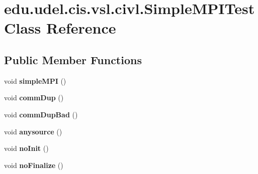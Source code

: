\hypertarget{classedu_1_1udel_1_1cis_1_1vsl_1_1civl_1_1SimpleMPITest}{}\section{edu.\+udel.\+cis.\+vsl.\+civl.\+Simple\+M\+P\+I\+Test Class Reference}
\label{classedu_1_1udel_1_1cis_1_1vsl_1_1civl_1_1SimpleMPITest}
\subsection*{Public Member Functions}
\begin{DoxyCompactItemize}
\item 
\hypertarget{classedu_1_1udel_1_1cis_1_1vsl_1_1civl_1_1SimpleMPITest_aabe92de2ada800d99d33b2e758fec8b9}{}void {\bfseries simple\+M\+P\+I} ()\label{classedu_1_1udel_1_1cis_1_1vsl_1_1civl_1_1SimpleMPITest_aabe92de2ada800d99d33b2e758fec8b9}

\item 
\hypertarget{classedu_1_1udel_1_1cis_1_1vsl_1_1civl_1_1SimpleMPITest_ab0e93f3e5bb94f5e2af7a9b6030aa806}{}void {\bfseries comm\+Dup} ()\label{classedu_1_1udel_1_1cis_1_1vsl_1_1civl_1_1SimpleMPITest_ab0e93f3e5bb94f5e2af7a9b6030aa806}

\item 
\hypertarget{classedu_1_1udel_1_1cis_1_1vsl_1_1civl_1_1SimpleMPITest_a67f129927e3798cc6d531cfe8e8eda6b}{}void {\bfseries comm\+Dup\+Bad} ()\label{classedu_1_1udel_1_1cis_1_1vsl_1_1civl_1_1SimpleMPITest_a67f129927e3798cc6d531cfe8e8eda6b}

\item 
\hypertarget{classedu_1_1udel_1_1cis_1_1vsl_1_1civl_1_1SimpleMPITest_a473a3d1949b66ff6d12a2d099d451c12}{}void {\bfseries anysource} ()\label{classedu_1_1udel_1_1cis_1_1vsl_1_1civl_1_1SimpleMPITest_a473a3d1949b66ff6d12a2d099d451c12}

\item 
\hypertarget{classedu_1_1udel_1_1cis_1_1vsl_1_1civl_1_1SimpleMPITest_a7a445fd948d68347f85217290ba6ecef}{}void {\bfseries no\+Init} ()\label{classedu_1_1udel_1_1cis_1_1vsl_1_1civl_1_1SimpleMPITest_a7a445fd948d68347f85217290ba6ecef}

\item 
\hypertarget{classedu_1_1udel_1_1cis_1_1vsl_1_1civl_1_1SimpleMPITest_a3741a84afc954e89e24a661f90934246}{}void {\bfseries no\+Finalize} ()\label{classedu_1_1udel_1_1cis_1_1vsl_1_1civl_1_1SimpleMPITest_a3741a84afc954e89e24a661f90934246}


\end{DoxyCompactItemize}
